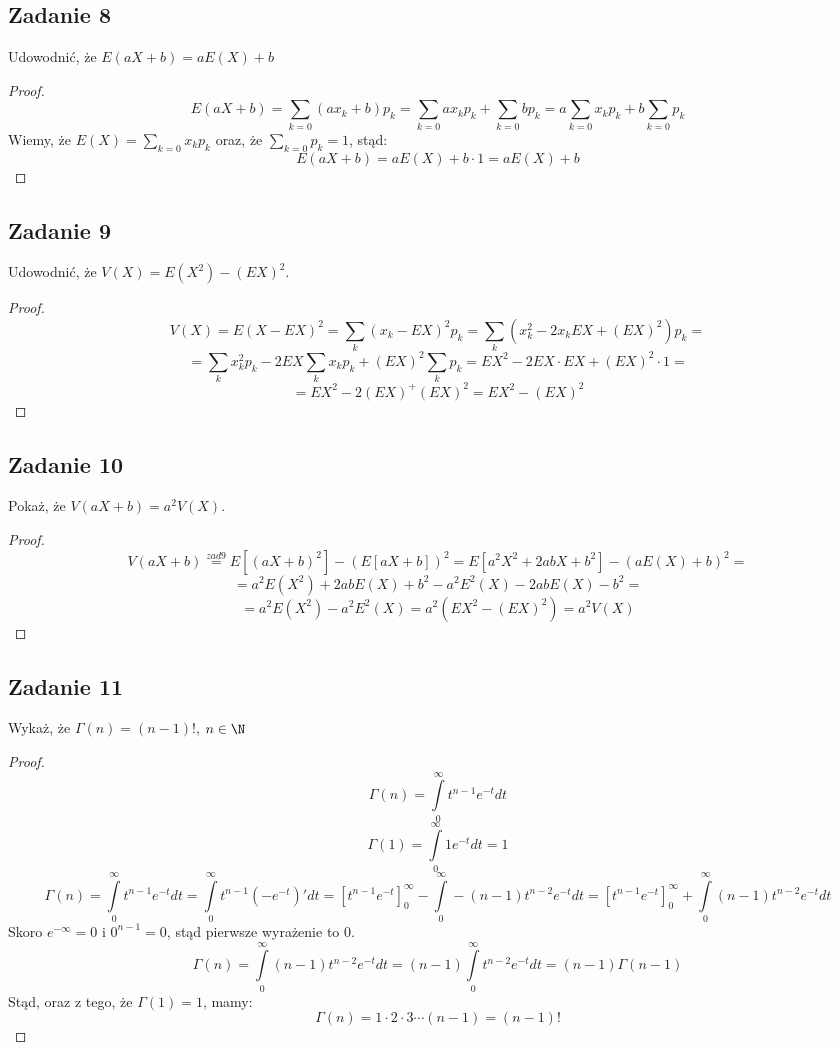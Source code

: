 \documentclass[a4paper]{article}
\begin{document}
\subsection*{Zadanie 8}
Udowodnić, że $E(aX+b)=aE(X)+b$
\begin{proof}
$$E(aX+b)=\sum\limits_{k=0} (a x_k + b) p_k = \sum\limits_{k=0} a x_k p_k + \sum\limits_{k=0} b p_k = a \sum\limits_{k=0} x_k p_k + b \sum\limits_{k=0}p_k$$
Wiemy, że  $E(X)=\sum\limits_{k=0} x_k p_k$ oraz, że $\sum\limits_{k=0}p_k = 1$, stąd:
$$E(aX+b) = a E(X) + b\cdot 1 =  a E(X) + b $$
\end{proof}

\subsection*{Zadanie 9}
Udowodnić, że $V(X)=E(X^2)-(EX)^2$.
\begin{proof}
$$V(X)=E(X-EX)^2=\sum\limits_k (x_k-EX)^2 p_k = \sum\limits_k (x_k^2-2x_kEX + (EX)^2) p_k =$$ $$= \sum\limits_k x_k^2 p_k - 2EX\sum\limits_k x_k p_k + (EX)^2 \sum\limits_k p_k =EX^2-2EX\cdot EX + (EX)^2 \cdot 1 =$$ $$= EX^2-2(EX)^+(EX)^2=EX^2-(EX)^2$$
\end{proof}

\subsection*{Zadanie 10}
Pokaż, że $V(aX + b) = a^2 V(X)$.\\
\begin{proof}
$$V(aX+b)\stackrel{zad 9}{=}E[(aX+b)^2]-(E[aX+b])^2=E[a^2X^2+2abX+b^2]-(aE(X)+b)^2=$$ $$=a^2E(X^2)+2abE(X)+b^2-a^2E^2(X)-2abE(X)-b^2=$$ $$=a^2E(X^2)-a^2E^2(X)=a^2(EX^2-(EX)^2)=a^2V(X) $$
\end{proof}

\subsection*{Zadanie 11}
Wykaż, że $\Gamma(n)=(n-1)!$, $n \in \N$
\begin{proof}
$$\Gamma(n)=\int\limits_0^\infty t^{n-1}e^{-t} dt$$
$$\Gamma(1)=\int\limits_0^\infty 1e^{-t} dt = 1$$
$$\Gamma(n)=\int\limits_0^\infty t^{n-1}e^{-t} dt = \int\limits_0^\infty t^{n-1}(-e^{-t})' dt = \left[t^{n-1}e^{-t}\right]_0^\infty - \int\limits_0^\infty -(n-1)t^{n-2}e^{-t} dt = \left[t^{n-1}e^{-t}\right]_0^\infty + \int\limits_0^\infty (n-1)t^{n-2}e^{-t} dt$$
Skoro $e^{-\infty}=0$ i $0^{n-1}=0$, stąd pierwsze wyrażenie to $0$.
$$\Gamma(n)=\int\limits_0^\infty (n-1)t^{n-2}e^{-t} dt = (n-1)\int\limits_0^\infty t^{n-2}e^{-t} dt=(n-1)\Gamma(n-1)$$
Stąd, oraz z tego, że $\Gamma(1)=1$, mamy:
$$\Gamma(n)=1\cdot 2\cdot 3 \cdots (n-1) = (n-1)! $$
\end{proof}
\end{document}
